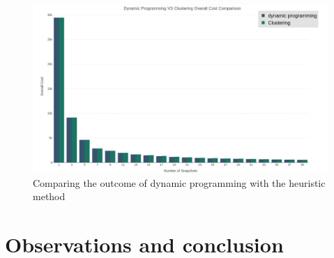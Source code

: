 \begin{figure}
	\label{fig:dynamic_vs_heuristic}
	\centering
	\includegraphics[width=\textwidth]{figs/dynamic_vs_clustering.jpg}
	\caption{Comparing the outcome of dynamic programming with the heuristic method}
\end{figure} 

\section{Observations and conclusion}